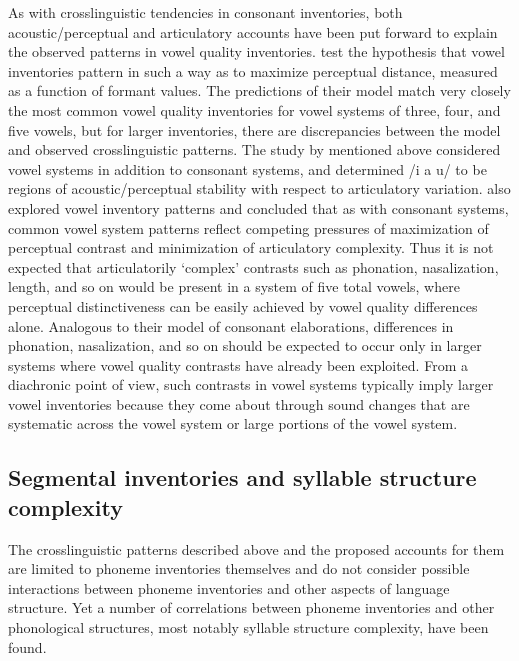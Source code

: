   As with crosslinguistic tendencies in consonant inventories, both acoustic/perceptual and articulatory accounts have been put forward to explain the observed patterns in vowel quality inventories. \citet{LiljencrantsLindblom1972} test the hypothesis that vowel inventories pattern in such a way as to maximize perceptual distance, measured as a function of formant values. The predictions of their model match very closely the most common vowel quality inventories for vowel systems of three, four, and five vowels, but for larger inventories, there are discrepancies between the model and observed crosslinguistic patterns. The study by \citet{Stevens1989} mentioned above considered vowel systems in addition to consonant systems, and determined /i a u/ to be regions of acoustic/perceptual stability with respect to articulatory variation. \citet{LindblomMaddieson1988} also explored vowel inventory patterns and concluded that as with consonant systems, common vowel system patterns reflect competing pressures of maximization of perceptual contrast and minimization of articulatory complexity. Thus it is not expected that articulatorily ‘complex’ contrasts such as phonation, nasalization, length, and so on would be present in a system of five total vowels, where perceptual distinctiveness can be easily achieved by vowel quality differences alone. Analogous to their model of consonant elaborations, differences in phonation, nasalization, and so on should be expected to occur only in larger systems where vowel quality contrasts have already been exploited. From a diachronic point of view, such contrasts in vowel systems typically imply larger vowel inventories because they come about through sound changes that are systematic across the vowel system or large portions of the vowel system.

\subsection{Segmental inventories and syllable structure complexity}\label{sec:4.1.3}

  The crosslinguistic patterns described above and the proposed accounts for them are limited to phoneme inventories themselves and do not consider possible interactions between phoneme inventories and other aspects of language structure. Yet a number of correlations between phoneme inventories and other phonological structures, most notably syllable structure complexity, have been found.


